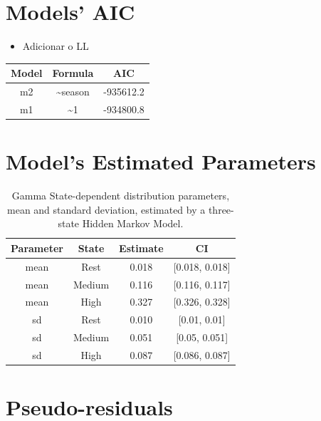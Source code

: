 \documentclass[english,msc,numbers,hidelinks]{coppe}
\providecommand{\tightlist}{%
  \setlength{\itemsep}{0pt}\setlength{\parskip}{0pt}}
\begin{document}
  \hypertarget{models-aic}{%
  \chapter{Models' AIC}\label{models-aic}}
  \begin{itemize}
  \tightlist
  \item
    Adicionar o LL
  \end{itemize}
  \begin{table}[!h]
  \centering
  \begin{tabular}{ccc}
  \toprule
  Model & Formula & AIC\\
  \midrule
  m2 & \textasciitilde{}season & -935612.2\\
  m1 & \textasciitilde{}1 & -934800.8\\
  \bottomrule
  \end{tabular}
  \end{table}
  \hypertarget{models-estimated-parameters}{%
  \chapter{Model's Estimated Parameters}\label{models-estimated-parameters}}
  \begin{table}[!h]

  \caption{\label{tab:appendix-parameters}Gamma State-dependent distribution parameters, mean and standard deviation, estimated by a three-state Hidden Markov Model.}
  \centering
  \begin{tabular}[t]{cccc}
  \toprule
  Parameter & State & Estimate & CI\\
  \midrule
  mean & Rest & 0.018 & {}[0.018, 0.018]\\
  mean & Medium & 0.116 & {}[0.116, 0.117]\\
  mean & High & 0.327 & {}[0.326, 0.328]\\
  sd & Rest & 0.010 & {}[0.01, 0.01]\\
  sd & Medium & 0.051 & {}[0.05, 0.051]\\
  \addlinespace
  sd & High & 0.087 & {}[0.086, 0.087]\\
  \bottomrule
  \end{tabular}
  \end{table}
  \hypertarget{pseudo-residuals}{%
  \chapter{Pseudo-residuals}\label{pseudo-residuals}}
\end{document}
